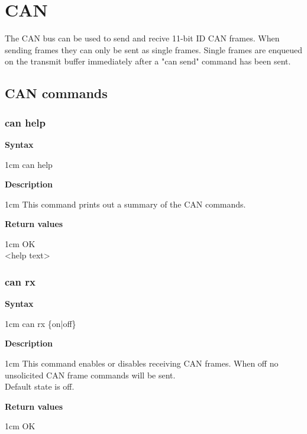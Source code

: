 \documentclass{article}[a4paper]
\begin{document}
\section{CAN}
The CAN bus can be used to send and recive 11-bit ID CAN frames.
When sending frames they can only be sent as single frames. Single frames are
enqueued on the transmit buffer immediately after a "can send" command has been sent.

\subsection{CAN commands}
\subsubsection{can help}
\begin{tcolorbox}
	{\bf Syntax}

	 1cm \dimexpr\linewidth-2cm\relax
	can help

	\medskip
	{\bf Description}

	 1cm \dimexpr\linewidth-2cm\relax
	This command prints out a summary of the CAN commands.

	\medskip
	{\bf Return values}

	 1cm \dimexpr\linewidth-2cm\relax
	OK \\
	<help text>
\end{tcolorbox}

\subsubsection{can rx}
\begin{tcolorbox}
	{\bf Syntax}

	 1cm \dimexpr\linewidth-2cm\relax
	can rx \{on|off\}

	\medskip
	{\bf Description}

	 1cm \dimexpr\linewidth-2cm\relax
	This command enables or disables receiving CAN frames. When off no unsolicited
	CAN frame commands will be sent. \\
	Default state is off.

	\medskip
	{\bf Return values}

	 1cm \dimexpr\linewidth-2cm\relax
	OK
\end{tcolorbox}
\end{document}
